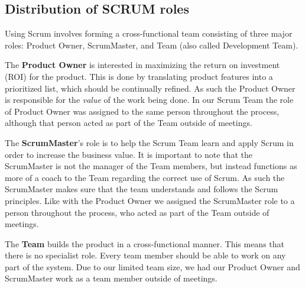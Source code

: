 \subsection{Distribution of SCRUM roles}

Using Scrum involves forming a cross-functional team consisting of three major roles: Product Owner, ScrumMaster, and Team (also called Development Team).

The \textbf{Product Owner} is interested in maximizing the return on investment (ROI) for the product. This is done by translating product features into a prioritized list, which should be continually refined. As such the Product Owner is responsible for the \textit{value} of the work being done. In our Scrum Team the role of Product Owner was assigned to the same person throughout the process, although that person acted as part of the Team outside of meetings.

The \textbf{ScrumMaster}'s role is to help the Scrum Team learn and apply Scrum in order to increase the business value. It is important to note that the ScrumMaster is not the manager of the Team members, but instead functions as more of a coach to the Team regarding the correct use of Scrum. As such the ScrumMaster makes sure that the team understands and follows the Scrum principles. Like with the Product Owner we assigned the ScrumMaster role to a person throughout the process, who acted as part of the Team outside of meetings.

The \textbf{Team} builds the product in a cross-functional manner. This means that there is no specialist role. Every team member should be able to work on any part of the system. Due to our limited team size, we had our Product Owner and ScrumMaster work as a team member outside of meetings.
